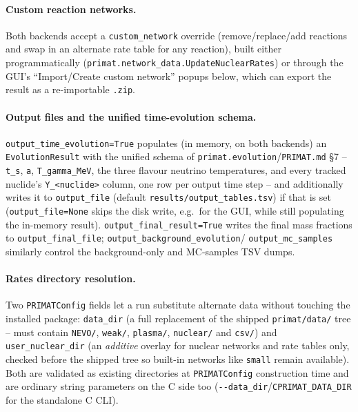 \documentclass[11pt,a4paper]{article}
\newcommand{\code}[1]{\texttt{#1}}
\begin{document}
\paragraph{Custom reaction networks.}\label{sec:custom-networks}
Both backends accept a \code{custom\_network} override (remove/replace/add
reactions and swap in an alternate rate table for any reaction), built either
programmatically (\code{primat.network\_data.UpdateNuclearRates}) or through
the GUI's ``Import/Create custom network'' popups below, which can export the
result as a re-importable \code{.zip}.

\paragraph{Output files and the unified time-evolution schema.}
\code{output\_time\_evolution=True} populates (in memory, on both backends)
an \code{EvolutionResult} with the unified schema of
\code{primat.evolution}/\code{PRIMAT.md} \S7 -- \code{t\_s}, \code{a},
\code{T\_gamma\_MeV}, the three flavour neutrino temperatures, and every
tracked nuclide's \code{Y\_<nuclide>} column, one row per output time step --
and additionally writes it to \code{output\_file} (default
\code{results/output\_tables.tsv}) if that is set (\code{output\_file=None}
skips the disk write, e.g.\ for the GUI, while still populating the
in-memory result). \code{output\_final\_result=True} writes the final mass
fractions to \code{output\_final\_file}; \code{output\_background\_evolution}/
\code{output\_mc\_samples} similarly control the background-only and
MC-samples TSV dumps.

\paragraph{Rates directory resolution.}
Two \code{PRIMATConfig} fields let a run substitute alternate data without
touching the installed package: \code{data\_dir} (a full replacement of the
shipped \code{primat/data/} tree -- must contain \code{NEVO/}, \code{weak/},
\code{plasma/}, \code{nuclear/} and \code{csv/}) and \code{user\_nuclear\_dir}
(an \emph{additive} overlay for nuclear networks and rate tables only,
checked before the shipped tree so built-in networks like \code{small}
remain available). Both are validated as existing directories at
\code{PRIMATConfig} construction time and are ordinary string parameters on
the C side too (\code{-{}-data\_dir}/\code{CPRIMAT\_DATA\_DIR} for the
standalone C CLI).
\end{document}
